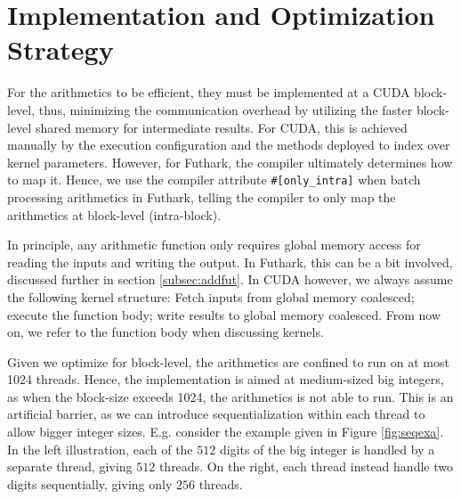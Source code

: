 \section{Implementation and Optimization Strategy}
\label{sec:strat}

For the arithmetics to be efficient, they must be implemented at a CUDA
block-level, thus, minimizing the communication overhead by utilizing the faster
block-level shared memory for intermediate results. For CUDA, this is achieved
manually by the execution configuration and the methods deployed to index over
kernel parameters. However, for Futhark, the compiler ultimately determines how
to map it. Hence, we use the compiler attribute \texttt{\#[only\_intra]} when
batch processing arithmetics in Futhark, telling the compiler to only map the
arithmetics at block-level (intra-block).

In principle, any arithmetic function only requires global memory access for
reading the inputs and writing the output. In Futhark, this can be a bit
involved, discussed further in section \ref{subsec:addfut}. In CUDA however, we
always assume the following kernel structure: Fetch inputs from global memory
coalesced; execute the function body; write results to global memory
coalesced. From now on, we refer to the function body when discussing kernels.

Given we optimize for block-level, the arithmetics are confined to run on at
most 1024 threads.  Hence, the implementation is aimed at medium-sized big
integers, as when the block-size exceeds 1024, the arithmetics is not able to
run. This is an artificial barrier, as we can introduce sequentialization within
each thread to allow bigger integer sizes. E.g. consider the example given in
Figure \ref{fig:seqexa}. In the left illustration, each of the $512$ digits of
the big integer is handled by a separate thread, giving $512$ threads. On the
right, each thread instead handle two digits sequentially, giving only $256$
threads.

